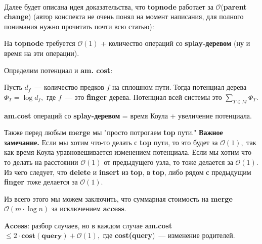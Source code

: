 $\quad$

Далее будет описана идея доказательства, что \textbf{topnode} работает за $\mathcal{O}$(\textbf{parent change}) (автор конспекта не очень понял на момент написания, для полного понимания нужно прочитать почти всю статью):

На \textbf{topnode} требуется $\mathcal{O}(1)$ + количество операций со \textbf{splay-деревом} (ну и время на эти операции).

Определим потенциал и \textbf{am. cost}:

Пусть $d_f$~--- количество предков $f$ на сплошном пути. Тогда потенциал дерева $\Phi_T = \log{d_f},$ где $f$~--- это \textbf{finger} дерева. Потенциал всей системы это $\sum\limits_{T\in M}\Phi_T.$

\textbf{am.cost} операций со \textbf{splay-деревом} = время Коула + увеличение потенциала. 

Также перед любым \textbf{merge} мы "просто потрогаем \textbf{top} пути." \textbf{Важное замечание.} Если мы хотим что-то делать с \textbf{top} пути, то это будет за $\mathcal{O}(1),$ так как время Коула уравновешивается изменением потенциала. Если мы хотим что-то делать на расстоянии $\mathcal{O}(1)$ от предыдущего узла, то тоже делается за $\mathcal{O}(1).$ Из чего следует, что \textbf{delete} и \textbf{insert} из \textbf{top}, в \textbf{top}, либо рядом с предыдущим \textbf{finger} тоже делается за $\mathcal{O}(1).$

Из всего этого мы можем заключить, что суммарная стоимость на \textbf{merge} $\mathcal{O}(m\cdot \log{n})$ за исключением \textbf{access}.

\textbf{Access}: разбор случаев, но в каждом случае \textbf{am.cost} $\leqslant 2\cdot \mathbf{cost(query)} + \mathcal{O}(1),$ где \textbf{cost(query})~--- изменение родителей.

